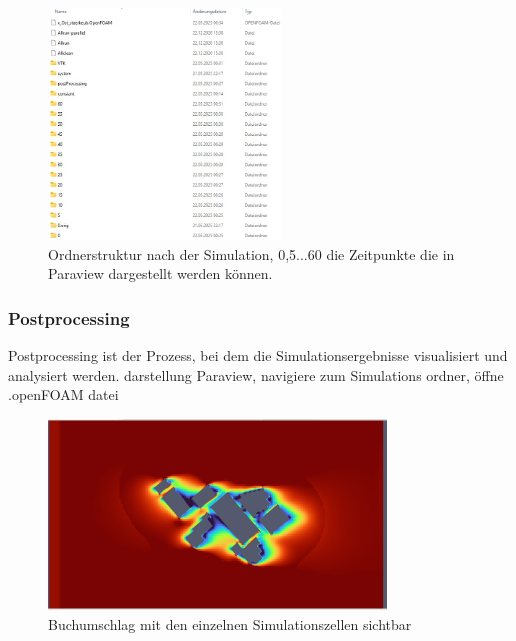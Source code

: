 \begin{figure}
    \centering
    \includegraphics[width=0.55\textwidth]{papers/openfoam/Bilder/Ordnerstruktur_Simuliert.jpg}
    \caption{Ordnerstruktur nach der Simulation, 0,5...60 die Zeitpunkte die in Paraview dargestellt werden können.}
    \label{fig:ordStrktSim}
\end{figure}


\subsubsection{Postprocessing}
Postprocessing ist der Prozess, bei dem die Simulationsergebnisse visualisiert und analysiert werden. 
darstellung
 Paraview, navigiere zum Simulations ordner, öffne .openFOAM datei

\begin{figure}
    \centering
    \includegraphics[width=0.8\textwidth]{papers/openfoam/Bilder/vorschlag_Wind_Westen_10m_blocky.png}
    \caption{Buchumschlag mit den einzelnen Simulationszellen sichtbar}
    \label{fig:vorschWindWestBlocky}
\end{figure}
